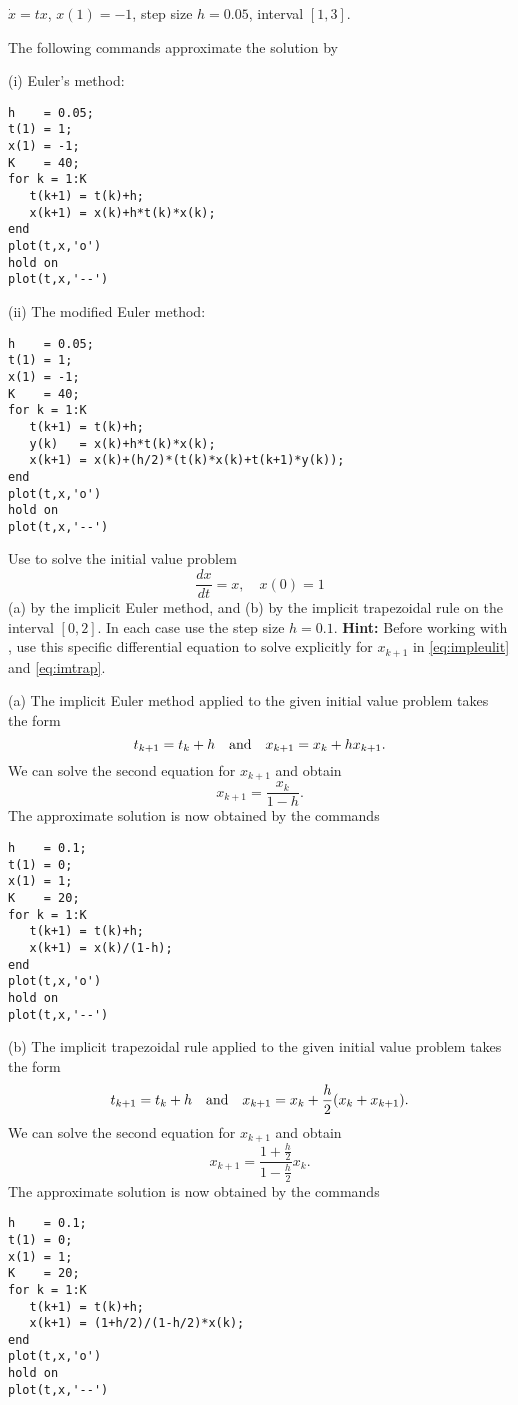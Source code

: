 \documentclass{ximera}
\begin{document}
\begin{exercise} \label{c15.1.5c}
$\dot x = tx$, $x(1)=-1$, step size $h=0.05$, interval $[1,3]$.

\begin{solution}
The following \Matlab commands approximate the solution by

(i) Euler's method:
\begin{verbatim}
h    = 0.05;
t(1) = 1;
x(1) = -1;
K    = 40;
for k = 1:K
   t(k+1) = t(k)+h;
   x(k+1) = x(k)+h*t(k)*x(k);
end
plot(t,x,'o')
hold on
plot(t,x,'--')
\end{verbatim}

(ii) The modified Euler method:
\begin{verbatim}
h    = 0.05;
t(1) = 1;
x(1) = -1;
K    = 40;
for k = 1:K
   t(k+1) = t(k)+h;
   y(k)   = x(k)+h*t(k)*x(k);
   x(k+1) = x(k)+(h/2)*(t(k)*x(k)+t(k+1)*y(k));
end
plot(t,x,'o')
hold on
plot(t,x,'--')
\end{verbatim}



\end{solution}
\end{exercise}

\begin{exercise} \label{c15.1.7}
Use \Matlab to solve the initial value problem
\[
\frac{dx}{dt} = x,\quad x(0)=1
\]
(a) by the implicit Euler method, and (b) by the implicit trapezoidal 
rule on the interval $[0,2]$.  In each case use the step size $h=0.1$.
{\bf Hint:} Before working with \Matlabp, use this specific differential
equation to solve explicitly for $x_{k+1}$ in \eqref{eq:impleulit} and 
\eqref{eq:imtrap}.

\begin{solution}

(a) The implicit Euler method applied to the given initial
value problem takes the form
\[
t_{k+1} = t_k + h\quad\mbox{and}\quad x_{k+1} = x_k + h x_{k+1}.
\]
We can solve the second equation  for $x_{k+1}$ and obtain
\[
x_{k+1} = \frac{x_k}{1-h}.
\]
The approximate solution is now obtained by the \Matlab commands
\begin{verbatim}
h    = 0.1;
t(1) = 0;
x(1) = 1;
K    = 20;
for k = 1:K
   t(k+1) = t(k)+h;
   x(k+1) = x(k)/(1-h);
end
plot(t,x,'o')
hold on
plot(t,x,'--')
\end{verbatim}

(b) The implicit trapezoidal rule applied to the given initial
value problem takes the form
\[
t_{k+1} = t_k + h\quad\mbox{and}\quad x_{k+1} = x_k + \frac{h}{2}(x_k+x_{k+1}).
\]
We can solve the second equation for $x_{k+1}$ and obtain
\[
x_{k+1} = \frac{1+\frac{h}{2}}{1-\frac{h}{2}}x_k.
\]
The approximate solution is now obtained by the \Matlab commands
\begin{verbatim}
h    = 0.1;
t(1) = 0;
x(1) = 1;
K    = 20;
for k = 1:K
   t(k+1) = t(k)+h;
   x(k+1) = (1+h/2)/(1-h/2)*x(k);
end
plot(t,x,'o')
hold on
plot(t,x,'--')
\end{verbatim}

\end{solution}
\end{exercise}
\end{document}
